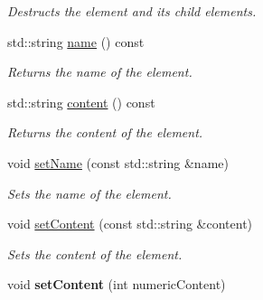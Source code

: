 \begin{DoxyCompactItemize}
\begin{DoxyCompactList}\small\item\em Destructs the element and its child elements. \item\end{DoxyCompactList}\item 
std::string \hyperlink{classXmlElement_a924c45bc90419123174ac9d11089cb6d}{name} () const 
\begin{DoxyCompactList}\small\item\em Returns the name of the element. \item\end{DoxyCompactList}\item 
std::string \hyperlink{classXmlElement_a3fea4e46ca4e63ceb905a96a8f304381}{content} () const 
\begin{DoxyCompactList}\small\item\em Returns the content of the element. \item\end{DoxyCompactList}\item 
void \hyperlink{classXmlElement_a0ed6ad08fd972865cca13ae2594fedda}{setName} (const std::string \&name)
\begin{DoxyCompactList}\small\item\em Sets the name of the element. \item\end{DoxyCompactList}\item 
void \hyperlink{classXmlElement_aaf32abf7cdaf31b8896f52a7859d9826}{setContent} (const std::string \&content)
\begin{DoxyCompactList}\small\item\em Sets the content of the element. \item\end{DoxyCompactList}\item 
\hypertarget{classXmlElement_ae8d473f1d193157158ae36e12929d387}{
void {\bfseries setContent} (int numericContent)}
\label{classXmlElement_ae8d473f1d193157158ae36e12929d387}


\end{DoxyCompactItemize}
